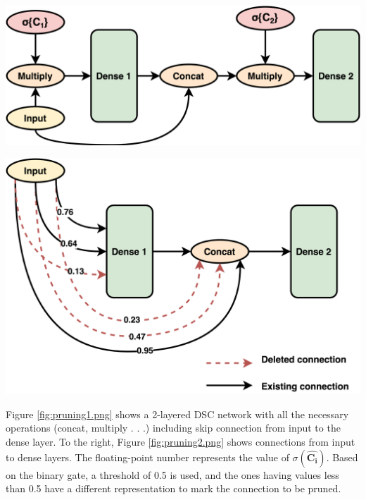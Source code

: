 \documentclass{article}
\let\oldhat\hat
\renewcommand{\hat}[1]{\oldhat{\mathbf{#1}}}
\begin{document}
\noindent\begin{minipage}{.5\textwidth}
   \centering
   \includegraphics[scale=0.1]{paper/Pruning1.png}
  \label{fig:pruning1.png}
\end{minipage}
\begin{minipage}{.4\textwidth}
\centering
   \includegraphics[scale=0.09]{paper/Pruning2.png}
\label{fig:pruning2.png}
\end{minipage}

Figure \ref{fig:pruning1.png} shows a 2-layered DSC network with all the necessary operations (concat, multiply . . .) including skip connection from input to the dense layer. To the right, Figure \ref{fig:pruning2.png} shows connections from input to dense layers. The floating-point number represents the value of  $\sigma(\hat{C_{i}})$. Based on the binary gate, a threshold of 0.5 is used, and the ones having values less than 0.5 have a different representation to mark the connection to be pruned.
\end{document}
